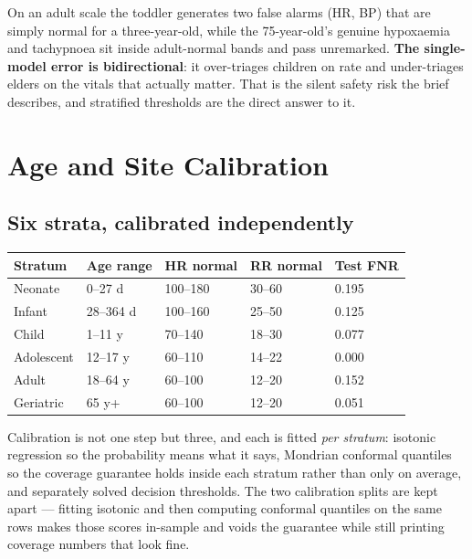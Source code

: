 \documentclass[10pt,a4paper,twocolumn]{article}
\begin{document}
\vspace{3pt}
On an adult scale the toddler generates two false alarms (HR, BP) that are simply normal for a
three-year-old, while the 75-year-old's genuine hypoxaemia and tachypnoea sit inside adult-normal
bands and pass unremarked. \textbf{The single-model error is bidirectional}: it over-triages
children on rate and under-triages elders on the vitals that actually matter. That is the silent
safety risk the brief describes, and stratified thresholds are the direct answer to it.

\section{Age and Site Calibration}
\label{sec:calib}

\subsection{Six strata, calibrated independently}
\begin{center}\footnotesize\sffamily
\begin{tabular}{@{}p{1.35cm}p{1.5cm}p{1.3cm}p{1.2cm}p{1.2cm}@{}}
\toprule
\rowcolor{AccPurple!10}
\textbf{Stratum} & \textbf{Age range} & \textbf{HR normal} & \textbf{RR normal} & \textbf{Test FNR}\\
\midrule
Neonate & 0--27 d & 100--180 & 30--60 & 0.195\\
Infant & 28--364 d & 100--160 & 25--50 & 0.125\\
Child & 1--11 y & 70--140 & 18--30 & 0.077\\
Adolescent & 12--17 y & 60--110 & 14--22 & 0.000\\
Adult & 18--64 y & 60--100 & 12--20 & 0.152\\
Geriatric & 65 y+ & 60--100 & 12--20 & 0.051\\
\bottomrule
\end{tabular}
\end{center}

\vspace{3pt}
Calibration is not one step but three, and each is fitted \emph{per stratum}: isotonic regression
so the probability means what it says, Mondrian conformal quantiles so the coverage guarantee holds
inside each stratum rather than only on average, and separately solved decision thresholds. The
two calibration splits are kept apart --- fitting isotonic and then computing conformal quantiles on
the same rows makes those scores in-sample and voids the guarantee while still printing coverage
numbers that look fine.
\end{document}
